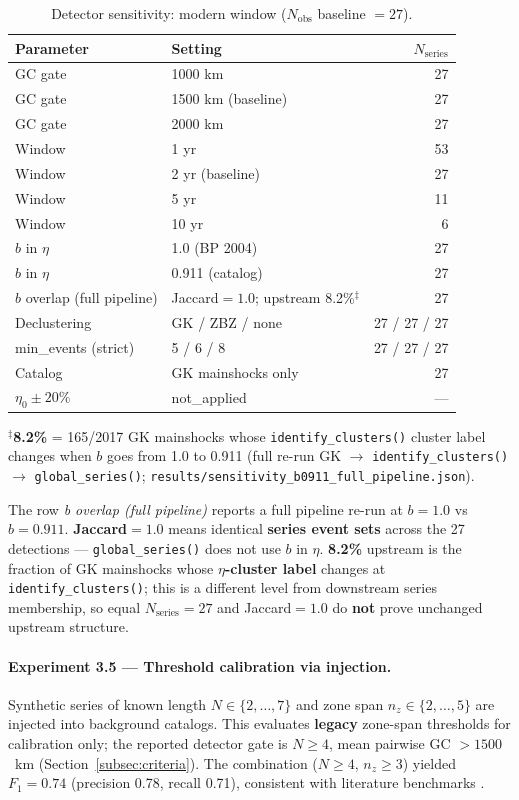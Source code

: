 \documentclass[draft]{agujournal2019}
\begin{document}
\begin{table}[htbp]
\centering
\caption{Detector sensitivity: modern window ($N_\mathrm{obs}$ baseline $= 27$).}
\label{tab:sensitivity}
\small
\begin{tabular}{llr}
\hline
Parameter & Setting & $N_\mathrm{series}$ \\
\hline
GC gate & 1000 km & 27 \\
GC gate & 1500 km (baseline) & 27 \\
GC gate & 2000 km & 27 \\
Window & 1 yr & 53 \\
Window & 2 yr (baseline) & 27 \\
Window & 5 yr & 11 \\
Window & 10 yr & 6 \\
$b$ in $\eta$ & 1.0 (BP 2004) & 27 \\
$b$ in $\eta$ & 0.911 (catalog) & 27 \\
$b$ overlap (full pipeline) & Jaccard$=1.0$; upstream 8.2\%$^{\ddagger}$ & 27 \\
Declustering & GK / ZBZ / none & 27 / 27 / 27 \\
min\_events (strict) & 5 / 6 / 8 & 27 / 27 / 27 \\
Catalog & GK mainshocks only & 27 \\
$\eta_0 \pm 20\%$ & not\_applied & --- \\
\hline
\end{tabular}
\end{table}

\noindent$^{\ddagger}$\textbf{8.2\%} = 165/2017 GK mainshocks whose \texttt{identify\_clusters()}
cluster label changes when $b$ goes from 1.0 to 0.911 (full re-run GK $\to$
\texttt{identify\_clusters()} $\to$ \texttt{global\_series()};
\texttt{results/sensitivity\_b0911\_full\_pipeline.json}).

\medskip
\noindent The row \emph{b overlap (full pipeline)} reports a full pipeline re-run at
$b=1.0$ vs $b=0.911$.
\textbf{Jaccard$=1.0$} means identical \textbf{series event sets} across the 27
detections --- \texttt{global\_series()} does not use $b$ in $\eta$.
\textbf{8.2\%} upstream is the fraction of GK mainshocks whose \textbf{$\eta$-cluster
label} changes at \texttt{identify\_clusters()}; this is a different level from
downstream series membership, so equal $N_\mathrm{series}=27$ and Jaccard$=1.0$ do
\textbf{not} prove unchanged upstream structure.

\paragraph{Experiment 3.5 --- Threshold calibration via injection.}
Synthetic series of known length $N \in \{2,\ldots,7\}$ and zone span
$n_z \in \{2,\ldots,5\}$ are injected into background catalogs.
This evaluates \textbf{legacy} zone-span thresholds for calibration only;
the reported detector gate is $N \ge 4$, mean pairwise GC $> 1500$~km
(Section~\ref{subsec:criteria}).  The combination ($N \ge 4$, $n_z \ge 3$)
yielded $F_1 = 0.74$ (precision 0.78, recall 0.71), consistent with
literature benchmarks \citep{ZaliapinBenZion2016}.
\end{document}
